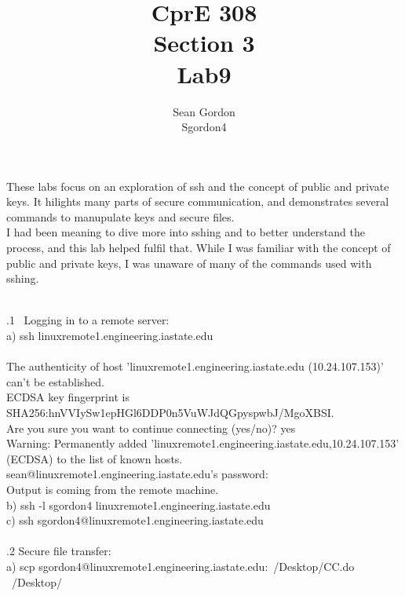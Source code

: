 \documentclass[12pt]{article}
\title{CprE 308\\Section 3\\Lab9}
\author{Sean Gordon\\Sgordon4}
\begin{document}
\maketitle

\noindent These labs focus on an exploration of ssh and the concept of public and private keys. It hilights many parts of secure communication, and demonstrates several commands to manupulate keys and secure files.\\

\noindent I had been meaning to dive more into sshing and to better understand the process, and this lab helped fulfil that. While I was familiar with the concept of public and private keys, I was unaware of many of the commands used with sshing.\\\\

\pagebreak

.1 \ Logging in to a remote server:\\

a) ssh linuxremote1.engineering.iastate.edu\\\\
The authenticity of host 'linuxremote1.engineering.iastate.edu (10.24.107.153)' can't be established.\\
ECDSA key fingerprint is SHA256:hnVVIySw1epHGl6DDP0n5VuWJdQGpyspwbJ/MgoXBSI.\\
Are you sure you want to continue connecting (yes/no)? yes\\
Warning: Permanently added 'linuxremote1.engineering.iastate.edu,10.24.107.153' (ECDSA) to the list of known hosts.\\
sean@linuxremote1.engineering.iastate.edu's password: \\

\noindent Output is coming from the remote machine.\\

b) ssh -l sgordon4 linuxremote1.engineering.iastate.edu\\

c) ssh sgordon4@linuxremote1.engineering.iastate.edu\\

\hrulefill\\

.2 Secure file transfer:\\

a) scp sgordon4@linuxremote1.engineering.iastate.edu:~/Desktop/CC.do ~/Desktop/\\
\end{document}

